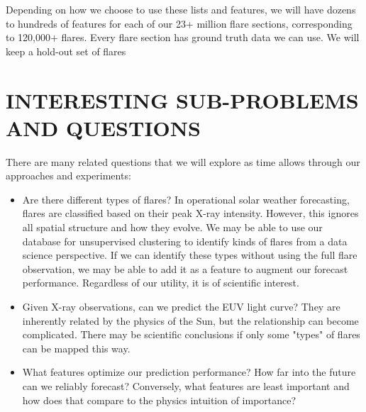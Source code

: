 \documentclass[letterpaper, 10 pt, onecolumn]{ieeeconf}
\begin{document}
Depending on how we choose to use these lists and features, we will have dozens to hundreds of features for each of our 23+ million flare sections, corresponding to 120,000+ flares. Every flare section has ground truth data we can use. We will keep a hold-out set of flares 

\section{INTERESTING SUB-PROBLEMS AND QUESTIONS}
There are many related questions that we will explore as time allows through our approaches and experiments:
\begin{itemize}
\item Are there different types of flares? In operational solar weather forecasting, flares are classified based on their peak X-ray intensity. However, this ignores all spatial structure and how they evolve. We may be able to use our database for unsupervised clustering to identify kinds of flares from a data science perspective. If we can identify these types without using the full flare observation, we may be able to add it as a feature to augment our forecast performance. Regardless of our utility, it is of scientific interest. 
\item Given X-ray observations, can we predict the EUV light curve? They are inherently related by the physics of the Sun, but the relationship can become complicated. There may be scientific conclusions if only some "types" of flares can be mapped this way. 
\item What features optimize our prediction performance? How far into the future can we reliably forecast? Conversely, what features are least important and how does that compare to the physics intuition of importance?
\end{itemize}
\end{document}
